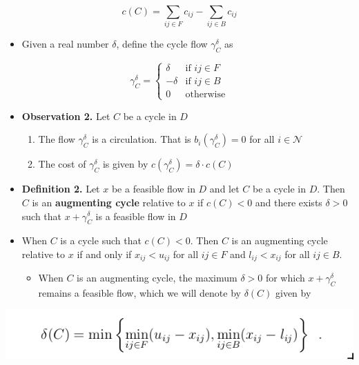 \documentclass[11pt]{article}
\begin{document}
\begin{enumerate}
\begin{equation}
  c(C) = \sum_{ij \in F} c_{ij} - \sum_{ij\in B} c_{ij}
\end{equation}
\begin{itemize}
\item Given a real number \(\delta\), define the cycle flow \(\gamma_C^\delta\) as
\end{itemize}
\begin{equation*}
  \gamma_C^\delta =
    \begin{cases}
      \mbox{$\delta$} & \mbox{if $ij \in F$} \\
      \mbox{$-\delta$} & \mbox{if $ij \in B$} \\
      \mbox{$0$} & \mbox{otherwise} 
    \end{cases}
\end{equation*}

\begin{itemize}
\item \textbf{Observation 2.} Let \(C\) be a cycle in \(D\)
\begin{enumerate}
\item The flow \(\gamma_C^\delta\) is a circulation. That is \(b_i(\gamma_C^\delta) = 0\) for all \(i \in \mathcal N\)
\item The cost of \(\gamma_C^\delta\) is given by \(c(\gamma_C^\delta) = \delta \cdot c(C)\)
\end{enumerate}

\item \textbf{Definition 2.} Let \(x\) be a feasible flow in \(D\) and let \(C\) be a cycle in \(D\). Then \(C\) is an \textbf{augmenting cycle} relative to \(x\) if \(c(C)<0\) and there exists \(\delta > 0\) such that \(x+\gamma_C^\delta\) is a feasible flow in \(D\)

\item When \(C\) is a cycle such that \(c(C) < 0\). Then \(C\) is an augmenting cycle relative to \(x\) if and only if \(x_{ij} < u_{ij}\) for all \(ij \in F\) and \(l_{ij} < x_{ij}\) for all \(ij \in B\).
\begin{itemize}
\item When \(C\) is an augmenting cycle, the maximum \(\delta >0\) for which \(x + \gamma_C^\delta\) remains a feasible flow, which we will denote by \(\delta(C)\) given by
\end{itemize}
\end{itemize}
\begin{center}
\includegraphics[width=.9\linewidth]{Network Flows/screenshot_2019-03-03_19-50-07.png}
\end{center}


\end{enumerate}
\end{document}
